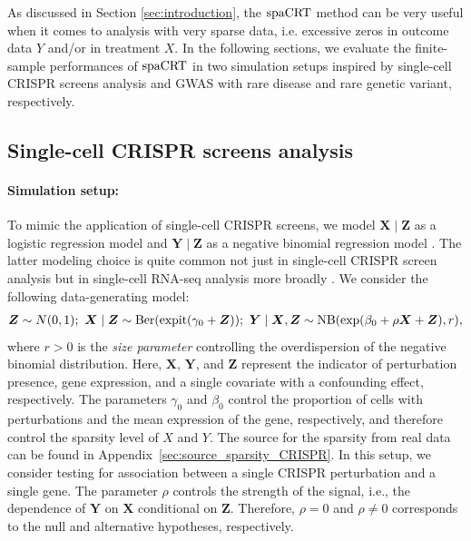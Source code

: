 \documentclass[12pt]{article}
\theoremstyle{definition}
\newcommand{\expit}{\mathrm{expit}}                 	%
\newcommand{\prx}{\bm X}								%
\newcommand{\srx}{X}									%
\newcommand{\prz}{\bm Z}								%
\newcommand{\pry}{{\bm Y}}								%
\newcommand{\sry}{Y}									%
\newcommand{\spacrt}{\textnormal{spaCRT}}               %
\begin{document}
  As discussed in Section \ref{sec:introduction}, the $\spacrt$ method can be very useful when it comes to analysis with very sparse data, i.e. excessive zeros in outcome data $Y$ and/or in treatment $X$. In the following sections, we evaluate the finite-sample performances of $\spacrt$ in two simulation setups inspired by single-cell CRISPR screens analysis and GWAS with rare disease and rare genetic variant, respectively.
  
  \subsection{Single-cell CRISPR screens analysis}\label{sec:CRISPR-screens}
  
  \paragraph{Simulation setup:}
  
  To mimic the application of single-cell CRISPR screens, we model $\prx\mid\prz$ as a logistic regression model and $\pry\mid\prz$ as a negative binomial regression model \citep{Barry2024,Katsevich2020c,Gasperini2019a}. The latter modeling choice is quite common not just in single-cell CRISPR screen analysis but in single-cell RNA-seq analysis more broadly \citep{Huang2018, Townes2019, Svensson2020}. We consider the following data-generating model:
  \small
  \begin{align}\label{eq:simulation-model-CRISPR-screens}
	\bm Z\sim N(0,1); \	\bm X \mid \bm Z\sim \textnormal{Ber}(\expit(\gamma_0+\bm Z));\ \bm Y \mid \bm X,\bm Z\sim \textnormal{NB}(\exp(\beta_0+\rho\bm X+\bm Z),r),
  \end{align}
  \normalsize
  where $r > 0$ is the \textit{size parameter} controlling the overdispersion of the negative binomial distribution. Here, $\prx$, $\pry$, and $\prz$ represent the indicator of perturbation presence, gene expression, and a single covariate with a confounding effect, respectively. The parameters $\gamma_0$ and $\beta_0$ control the proportion of cells with perturbations and the mean expression of the gene, respectively, and therefore control the sparsity level of $\srx$ and $\sry$. The source for the sparsity from real data can be found in Appendix~\ref{sec:source_sparsity_CRISPR}. In this setup, we consider testing for association between a single CRISPR perturbation and a single gene. The parameter $\rho$ controls the strength of the signal, i.e., the dependence of $\pry$ on $\prx$ conditional on $\prz$. Therefore, $\rho = 0$ and $\rho \neq 0$ corresponds to the null and alternative hypotheses, respectively. 
  
\end{document}
